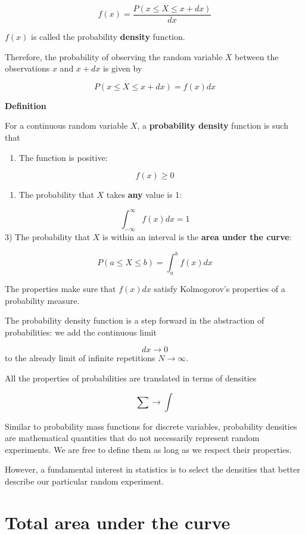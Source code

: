 \documentclass[
]{book}
\providecommand{\tightlist}{%
  \setlength{\itemsep}{0pt}\setlength{\parskip}{0pt}}
\begin{document}
\[f(x)= \frac{P(x\leq X \leq x+dx)}{dx}\]

\(f(x)\) is called the probability \textbf{density} function.

Therefore, the probability of observing the random variable \(X\) between the observations \(x\) and \(x+dx\)
is given by

\[P(x\leq X \leq x+dx)= f(x) dx\]

\textbf{Definition}

For a continuous random variable \(X\), a \textbf{probability density} function is such that

\begin{enumerate}
\def\labelenumi{\arabic{enumi})}
\tightlist
\item
  The function is positive:
\end{enumerate}

\[f(x) \geq 0\]

\begin{enumerate}
\def\labelenumi{\arabic{enumi})}
\setcounter{enumi}{1}
\tightlist
\item
  The probability that \(X\) takes \textbf{any} value is 1:
\end{enumerate}

\[\int_{-\infty}^{\infty} f(x) dx = 1\]
3) The probability that \(X\) is within an interval is the \textbf{area under the curve}:

\[P(a\leq X \leq b)=\int_{a}^{b} f(x) dx\]

The properties make sure that \(f(x)dx\) satisfy Kolmogorov's properties of a probability measure.

The probability density function is a step forward in the abstraction of probabilities: we add the continuous limit

\[dx \rightarrow 0\]
to the already limit of infinite repetitions \(N \rightarrow \infty\).

All the properties of probabilities are translated in terms of densities

\[\sum \rightarrow \int\]

Similar to probability mass functions for discrete variables, probability densities are mathematical quantities that do not necessarily represent random experiments. We are free to define them as long as we respect their properties.

However, a fundamental interest in statistics is to select the densities that better describe our particular random experiment.

\hypertarget{total-area-under-the-curve}{%
\section{Total area under the curve}\label{total-area-under-the-curve}}
\end{document}

